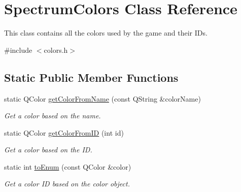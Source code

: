 \hypertarget{class_spectrum_colors}{}\section{Spectrum\+Colors Class Reference}
\label{class_spectrum_colors}


This class contains all the colors used by the game and their I\+Ds.  




{\ttfamily \#include $<$colors.\+h$>$}

\subsection*{Static Public Member Functions}
\begin{DoxyCompactItemize}
\item 
static Q\+Color \hyperlink{class_spectrum_colors_ae0d4521870a0b52038556abbc135ba28}{get\+Color\+From\+Name} (const Q\+String \&color\+Name)
\begin{DoxyCompactList}\small\item\em Get a color based on the name. \end{DoxyCompactList}\item 
static Q\+Color \hyperlink{class_spectrum_colors_a7a0be9b9aa0b40fe03b956263671c861}{get\+Color\+From\+ID} (int id)
\begin{DoxyCompactList}\small\item\em Get a color based on the ID. \end{DoxyCompactList}\item 
static int \hyperlink{class_spectrum_colors_a51d3b530d739592685c70d32df2253c9}{to\+Enum} (const Q\+Color \&color)
\begin{DoxyCompactList}\small\item\em Get a color ID based on the color object. \end{DoxyCompactList}\end{DoxyCompactItemize}
